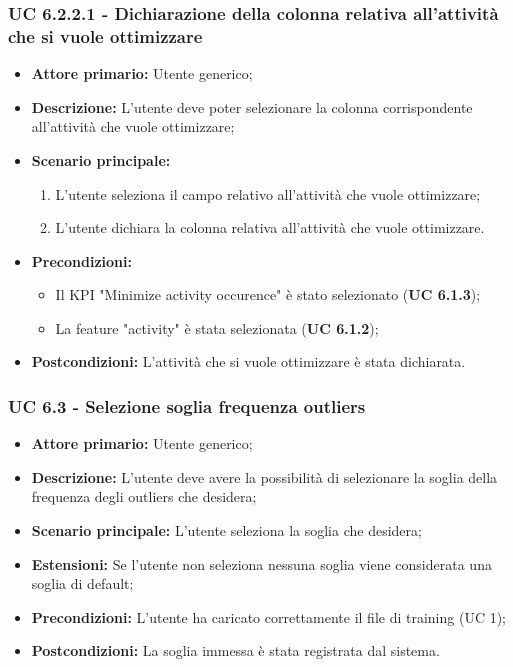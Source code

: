 \subsubsection{UC 6.2.2.1 - Dichiarazione della colonna relativa all'attività che si vuole ottimizzare}
\begin{itemize}
	\item \textbf{Attore primario:} Utente generico;
	\item \textbf{Descrizione:} L'utente deve poter selezionare la colonna corrispondente all'attività che vuole ottimizzare;
	\item \textbf{Scenario principale:} 
		\begin{enumerate}
			\item L'utente seleziona il campo relativo all'attività che vuole ottimizzare;
			\item L'utente dichiara la colonna relativa all'attività che vuole ottimizzare.
		\end{enumerate}
	\item \textbf{Precondizioni:} 
		\begin{itemize}
			\item Il KPI "Minimize activity occurence" è stato selezionato (\textbf{UC 6.1.3});
			\item La feature "activity" è stata selezionata (\textbf{UC 6.1.2});
		\end{itemize}			
	
	
	\item \textbf{Postcondizioni:} L'attività che si vuole ottimizzare è stata dichiarata.
\end{itemize}


\subsubsection{UC 6.3 - Selezione soglia frequenza outliers}
\begin{itemize}
	\item \textbf{Attore primario:} Utente generico;
	\item \textbf{Descrizione:} L'utente deve avere la possibilità di selezionare la soglia della frequenza degli outliers che desidera;
	\item \textbf{Scenario principale:} L'utente seleziona la soglia che desidera;
	\item \textbf{Estensioni:} Se l'utente non seleziona nessuna soglia viene considerata una soglia di default;
	\item \textbf{Precondizioni:} L'utente ha caricato correttamente il file di training (UC 1);
	\item \textbf{Postcondizioni:} La soglia immessa è stata registrata dal sistema.
\end{itemize}






